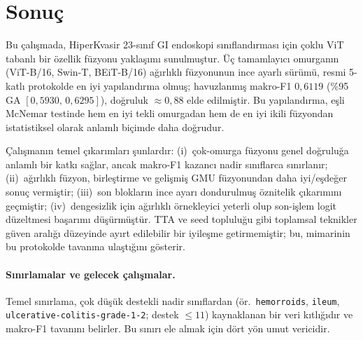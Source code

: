 \section{Sonuç}
\label{sec:conclusion}

Bu çalışmada, HiperKvasir 23-sınıf GI endoskopi sınıflandırması için çoklu ViT
tabanlı bir özellik füzyonu yaklaşımı sunulmuştur. Üç tamamlayıcı omurganın
(ViT-B/16, Swin-T, BEiT-B/16) ağırlıklı füzyonunun ince ayarlı sürümü, resmi
5-katlı protokolde en iyi yapılandırma olmuş; havuzlanmış makro-F1
$0{,}6119$ (\%95 GA $[0{,}5930,\,0{,}6295]$), doğruluk $\approx 0{,}88$
elde edilmiştir. Bu yapılandırma, eşli McNemar testinde hem en iyi tekli
omurgadan hem de en iyi ikili füzyondan istatistiksel olarak anlamlı biçimde
daha doğrudur.

Çalışmanın temel çıkarımları şunlardır: (i)~çok-omurga füzyonu genel doğruluğa
anlamlı bir katkı sağlar, ancak makro-F1 kazancı nadir sınıflarca sınırlanır;
(ii)~ağırlıklı füzyon, birleştirme ve gelişmiş GMU füzyonundan daha iyi/eşdeğer
sonuç vermiştir; (iii)~son blokların ince ayarı dondurulmuş öznitelik çıkarımını
geçmiştir;
(iv)~dengesizlik için ağırlıklı örnekleyici yeterli olup son-işlem logit
düzeltmesi başarımı düşürmüştür. TTA ve seed topluluğu gibi toplamsal teknikler
güven aralığı düzeyinde ayırt edilebilir bir iyileşme getirmemiştir; bu, mimarinin
bu protokolde tavanına ulaştığını gösterir.

\paragraph{Sınırlamalar ve gelecek çalışmalar.} Temel sınırlama, çok düşük
destekli nadir sınıflardan (ör.\ \texttt{hemorroids}, \texttt{ileum},
\texttt{ulcerative-colitis-grade-1-2}; destek $\leq 11$) kaynaklanan bir veri
kıtlığıdır ve makro-F1 tavanını belirler. Bu sınırı ele almak için dört yön umut
vericidir.

